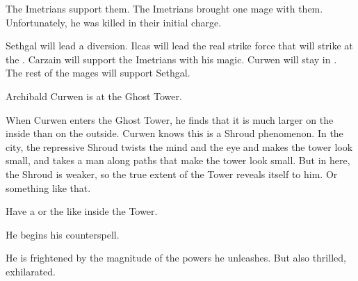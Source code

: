 The Imetrians support them.
The Imetrians brought one mage with them. 
Unfortunately, he was killed in their initial charge. 

Sethgal will lead a diversion. 
Ilcas will lead the real strike force that will strike at the \ishrah. 
Carzain will support the Imetrians with his magic. 
Curwen will stay in \Forclin. 
The rest of the mages will support Sethgal. 





\begin{comment}
  \subsection{Curwen begins his counterspell}
\end{comment}
\new
Archibald Curwen is at the Ghost Tower. 

When Curwen enters the Ghost Tower, he finds that it is much larger on the inside than on the outside.
Curwen knows this is a Shroud phenomenon.
In the city, the repressive Shroud twists the mind and the eye and makes the tower look small, and takes a man along paths that make the tower look small.
But in here, the Shroud is weaker, so the true extent of the Tower reveals itself to him.
Or something like that.

Have a  or the like inside the Tower. 


He begins his counterspell. 


He is frightened by the magnitude of the powers he unleashes. 
But also thrilled, exhilarated.






